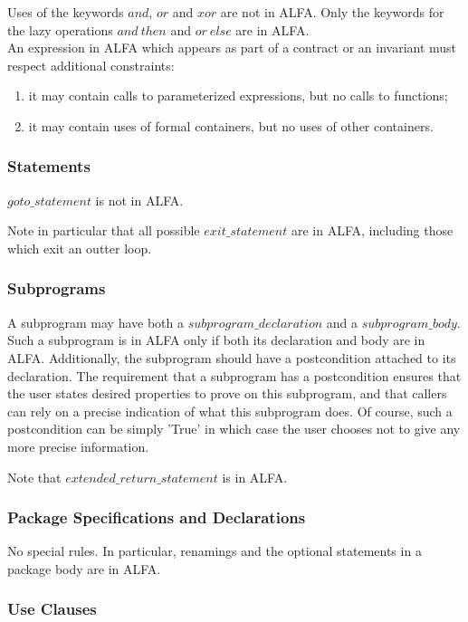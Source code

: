 \documentclass{article}
\newcommand{\bnf}[1]{$\mathit{#1}$}
\begin{document}
Uses of the keywords \bnf{and}, \bnf{or} and \bnf{xor} are not in ALFA. Only
the keywords for the lazy operations \bnf{and\ then} and \bnf{or\ else} are in
ALFA.\\

An expression in ALFA which appears as part of a contract or an invariant must
respect additional constraints:
\begin{enumerate}
\item it may contain calls to parameterized expressions, but no calls to
  functions;
\item it may contain uses of formal containers, but no uses of other
  containers.
\end{enumerate}

\subsubsection{Statements}

\noindent
\bnf{goto\_statement} is not in ALFA.

Note in particular that all possible \bnf{exit\_statement} are in ALFA,
including those which exit an outter loop.

\subsubsection{Subprograms}

A subprogram may have both a \bnf{subprogram\_declaration} and a
\bnf{subprogram\_body}. Such a subprogram is in ALFA only if both its
declaration and body are in ALFA. Additionally, the subprogram should have a
postcondition attached to its declaration. The requirement that a subprogram
has a postcondition ensures that the user states desired properties to prove on
this subprogram, and that callers can rely on a precise indication of what this
subprogram does. Of course, such a postcondition can be simply 'True' in which
case the user chooses not to give any more precise information.

Note that \bnf{extended\_return\_statement} is in ALFA.

\subsubsection{Package Specifications and Declarations}

No special rules. In particular, renamings and the optional statements in a
package body are in ALFA.

\subsubsection{Use Clauses}
\end{document}
